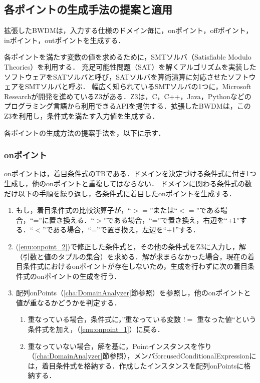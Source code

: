 \documentclass[uplatex, report, a4j, 10pt]{jsbook}
\begin{document}
\subsection{各ポイントの生成手法の提案と適用}\label{cha:create_point}
拡張したBWDMは，入力する仕様のドメイン毎に，onポイント，offポイント，inポイント，outポイントを生成する．

各ポイントを満たす変数の値を求めるために，SMTソルバ（Satisfiable Modulo Theories）\cite{sat}を利用する．
充足可能性問題（SAT）を解くアルゴリズムを実装したソフトウェアをSATソルバと呼び，SATソルバを算術演算に対応させたソフトウェアをSMTソルバと呼ぶ．
幅広く知られているSMTソルバの1つに，Microsoft Researchが開発を進めているZ3\cite{z3}がある．Z3は，C，C++，Java，Pythonなどのプログラミング言語から利用できるAPIを提供する．拡張したBWDMは，このZ3を利用し，条件式を満たす入力値を生成する．

各ポイントの生成方法の提案手法を，以下に示す．

\subsubsection{onポイント}
onポイントは，着目条件式のTBである．ドメインを決定づける条件式に付き1つ生成し，他のonポイントと重複してはならない．
ドメインに関わる条件式の数だけ以下の手順を繰り返し，各条件式に着目したonポイントを生成する．
\begin{enumerate}
	\item\label{enu:onpoint_2} もし，着目条件式の比較演算子が，“$>=$”または“$<=$”である場合，“=”に置き換える．“$>$”である場合，“=”で置き換え，右辺を“+1”する．“$<$”である場合，“=”で置き換え，左辺を“+1”する．
	\item\label{enu:onpoint_1} (\ref{enu:onpoint_2})で修正した条件式と，その他の条件式をZ3に入力し，解（引数と値のタプルの集合）を求める．解が求まらなかった場合，現在の着目条件式におけるonポイントが存在しないため，生成を行わずに次の着目条件式のonポイントの生成を行う．
	\item 配列onPoints（\ref{cha:DomainAnalyzer}節参照）を参照し，他のonポイントと値が重なるかどうかを判定する．
	      \begin{enumerate}
	      	\item 重なっている場合，条件式に，”重なっている変数 $!=$ 重なった値“という条件式を加え，（\ref{enu:onpoint_1}）に戻る．
	      	\item 重なっていない場合，解を基に，Pointインスタンスを作り（\ref{cha:DomainAnalyzer}節参照），メンバforcusedConditionalExpressionには，着目条件式を格納する．作成したインスタンスを配列onPointsに格納する．
	      \end{enumerate}
\end{enumerate}
\end{document}
